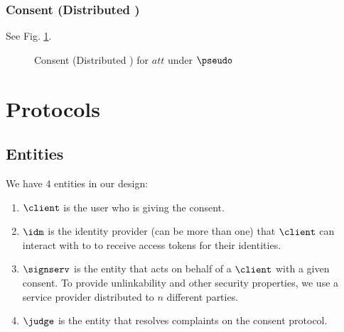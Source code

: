 \subsubsection{Consent (Distributed \idm)}
 See Fig. \ref{prot:consent_distidm}.
\begin{figure*}[h]
\caption{Consent (Distributed \idm) for $att$ under $\pseudo$}
\label{prot:consent_distidm}
\end{figure*}


\newpage
\section{Protocols}
\subsection{Entities}
We have 4 entities in our design:
\begin{enumerate}
    \item $\client$ is the user who is giving the consent.
    \item $\idm$ is the identity provider (can be more than one) that $\client$ can interact with to to receive access tokens for their identities.
    \item $\signserv$ is the entity that acts on behalf of a $\client$ with a given consent. To provide unlinkability and other security properties, we use a service provider distributed to $n$ different parties.
    \item $\judge$ is the entity that resolves complaints on the consent protocol.
\end{enumerate}

